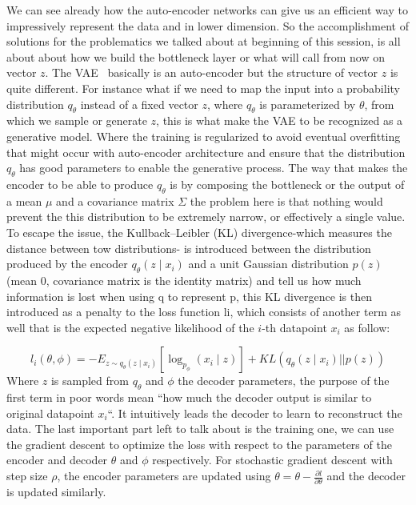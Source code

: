 We can see already how the auto-encoder networks can give us an efficient way to  impressively represent the data and in lower dimension. So the accomplishment of solutions for the problematics we talked about at beginning of this session, is all about about how we build the bottleneck layer or what will call from now on vector $z$. The VAE~\cite{kingma2013auto} basically is an auto-encoder but the structure of vector $z$ is quite different. For instance what if we need to map the input into a probability distribution $q_{\theta}$ instead of a fixed vector $z$, where $q_{\theta}$ is parameterized by $\theta$, from which we sample or generate $z$, this is what make the VAE to be recognized as a generative model. Where the training is regularized to avoid eventual overfitting  that might occur with auto-encoder architecture and ensure that the distribution $q_{\theta}$ has good parameters to enable the generative process. The way that makes the encoder to be able to produce $q_\theta$ is by composing the bottleneck or the output of a mean $\mu$ and a covariance matrix $\Sigma$ the problem here is that nothing would prevent the this distribution to be extremely narrow, or effectively a single value. To escape the issue, the Kullback–Leibler (KL) divergence-which measures the distance between tow distributions- is introduced  between the distribution produced by the encoder $q_{\theta}(z \mid x_i)$ and a unit Gaussian distribution $p(z)$(mean $0$, covariance matrix is the identity matrix) and tell us how much information is lost when using q to represent p, this KL divergence is then introduced as a penalty to the loss function li, which consists of another term as well that is the expected negative likelihood of the $i$-th datapoint $x_i$ as follow:


\begin{equation}
l_i(\theta,\phi)=-E_{z\sim q_\theta (z\mid x_i)}[\log_{p_\phi}(x_i \mid z)]+KL(q_\theta (z\mid x_i)||p(z))
\label{eq:VAE_loss}
\end{equation}
Where $z$ is sampled from $q_\theta$ and $\phi$ the decoder parameters, the purpose of the first term in poor words mean “how much the decoder output is similar to original datapoint $x_i$“. It intuitively leads the decoder to learn to reconstruct the data. The last important part left to talk about is the training one, we can use the gradient descent to optimize the loss with respect to the parameters of the encoder and decoder $\theta$ and $\phi$ respectively. For stochastic gradient descent with step size $\rho$, the encoder parameters are updated using $\theta=\theta-\frac{\partial l}{\partial \theta} $  and the decoder is updated similarly.



